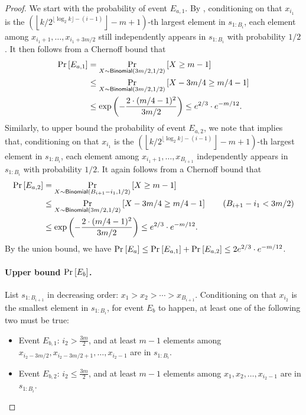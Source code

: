 \begin{proof}
We start with the probability of event $E_{a,1}$. By , conditioning on that $x_{i_1}$ is the $\left(\left\lfloor k/2^{\lfloor\log_2 k\rfloor - (i-1)}\right\rfloor - m+1\right)$-th largest element in $s_{1:B_i}$, each element among $ x_{i_1 + 1}, \ldots, x_{i_1 + 3m/2}$ still independently appears in $s_{1:B_i}$ with probability $1/2$. It then follows from a Chernoff bound that
\begin{align*}
  \Pr_{}\left[E_{a,1}\right]
&=  \Pr_{X \sim \mathsf{Binomial}(3m/2, 1/2)}\left[X \ge m-1\right]\\
&\le\Pr_{X \sim \mathsf{Binomial}(3m/2, 1/2)}\left[X -3m/4 \ge m/4-1\right]\\
&\le\exp\left(-\frac{2\cdot(m / 4 -1)^2}{3m/2}\right)
\le e^{2/3}\cdot   e^{-m/12}.
\end{align*}
Similarly, to upper bound the probability of event $E_{a,2}$, we note that  implies that, conditioning on that $x_{i_1}$ is the $\left(\left\lfloor k/2^{\lfloor\log_2 k\rfloor - (i-1)}\right\rfloor - m+1\right)$-th largest element in $s_{1:B_i}$, each element among $ x_{i_1 + 1}, \ldots, x_{B_{i+1}}$ independently appears in $s_{1:B_i}$ with probability $1/2$. It again follows from a Chernoff bound that
\begin{align*}
  \pr{}{E_{a,2}}
&=  \pr{X \sim \Binomial(B_{i+1}-i_1, 1/2)}{X \ge m-1}\\
&\le\pr{X \sim \Binomial(3m/2, 1/2)}{X -3m/4 \ge m/4-1} \tag{$B_{i+1} - i_1 < 3m/2$}\\
&\le\exp\left(-\frac{2\cdot(m / 4 -1)^2}{3m/2}\right)
\le e^{2/3}\cdot e^{-m/12}.
\end{align*}
By the union bound, we have $\Pr_{}\left[E_a\right] \le \Pr_{}\left[E_{a,1}\right] + \Pr_{}\left[E_{a,2}\right] \le 2e^{2/3}\cdot e^{-m/12}$.

\paragraph{Upper bound $\Pr_{}\left[E_b\right]$.}
List $s_{1:B_{i+1}}$ in decreasing order:  $x_1> x_2 > \cdots> x_{B_{i+1}}$.
Conditioning on that $x_{i_2}$ is the smallest element in $s_{1:B_i}$, for event $E_b$ to happen, at least one of the following two must be true:
\begin{itemize}
    \item Event $E_{b,1}$: $i_2 > \frac{3m}{2}$, and at least $m-1$ elements among $x_{i_2- 3m/2}, x_{i_2- 3m/2+1},  \ldots, x_{i_2-1}$ are in $s_{1:B_i}$.
    \item Event $E_{b,2}$: $i_2 \le \frac{3m}{2}$, and at least $m-1$ elements among $x_{1}, x_2, \ldots, x_{i_2-1}$ are in $s_{1:B_i}$.
\end{itemize}


\end{proof}
